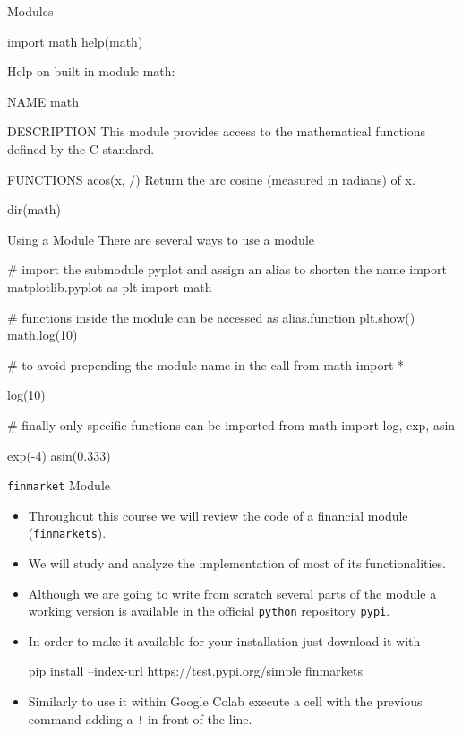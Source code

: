\documentclass{beamer}
\begin{document}
\begin{frame}[fragile]{Modules}
\begin{ipython}
import math
help(math)
\end{ipython}
\begin{ioutput}
Help on built-in module math:

NAME
    math

DESCRIPTION
    This module provides access to the mathematical functions
    defined by the C standard.

FUNCTIONS
    acos(x, /)
        Return the arc cosine (measured in radians) of x.
\end{ioutput}
\begin{ipython}
dir(math)
\end{ipython}
\begin{ioutput}
['__doc__', '__loader__', '__name__', '__package__', '__spec__', 'acos',
 'acosh', 'asin', 'asinh', 'atan', 'atan2', 'atanh', ...
\end{ioutput}    
\end{frame}

\begin{frame}[fragile]{Using a Module}
  There are several ways to use a module
  \begin{ipython}
# import the submodule pyplot and assign an alias to shorten the name    
import matplotlib.pyplot as plt
import math

# functions inside the module can be accessed as alias.function
plt.show()
math.log(10)

# to avoid prepending the module name in the call
from math import *

log(10)

# finally only specific functions can be imported
from math import log, exp, asin

exp(-4)
asin(0.333)
\end{ipython}
\end{frame}

\begin{frame}[fragile]{\texttt{finmarket} Module}
  \begin{itemize}
  \item Throughout this course we will review the code of a financial module (\texttt{finmarkets}).
  \item We will study and analyze the implementation of most of its functionalities.
  \item Although we are going to write from scratch several parts of the module a working version is available in the official \texttt{python} repository \texttt{pypi}.
  \item In order to make it available for your installation just download it with
\begin{ipython}
pip install --index-url https://test.pypi.org/simple finmarkets
\end{ipython}
  \item Similarly to use it within Google Colab execute a cell with the previous command adding a \texttt{!} in front of the line.
  \end{itemize}
\end{frame}
\end{document}
